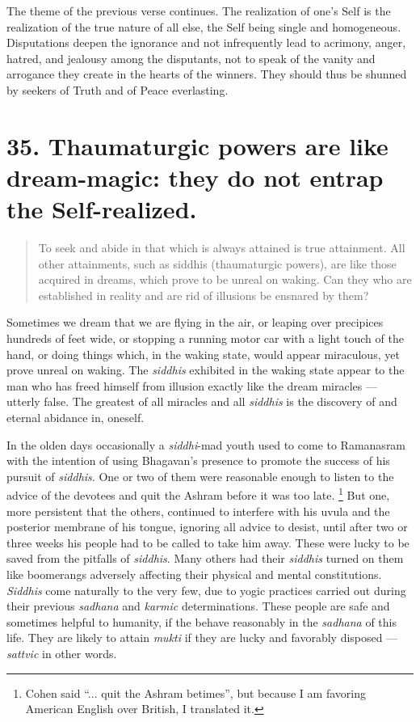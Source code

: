 \documentclass[12pt]{report}
\begin{document}
The theme of the previous verse continues. The realization of one's
Self is the realization of the true nature of all else, the Self being
single and homogeneous. Disputations deepen the ignorance and not
infrequently lead to acrimony, anger, hatred, and jealousy among the
disputants, not to speak of the vanity and arrogance they create in
the hearts of the winners. They should thus be shunned by seekers of
Truth and of Peace everlasting.

\section{35. Thaumaturgic powers are like dream-magic: they do not
  entrap the Self-realized.}

\begin{quote}
  To seek and abide in that which is always attained is true
  attainment. All other attainments, such as siddhis (thaumaturgic
  powers), are like those acquired in dreams, which prove to be unreal
  on waking. Can they who are established in reality and are rid of
  illusions be ensnared by them?
\end{quote}


Sometimes we dream that we are flying in the air, or leaping over
precipices hundreds of feet wide, or stopping a running motor car with
a light touch of the hand, or doing things which, in the waking state,
would appear miraculous, yet prove unreal on waking. The
\emph{siddhis} exhibited in the waking state appear to the man who has
freed himself from illusion exactly like the dream miracles ---
utterly false. The greatest of all miracles and all \emph{siddhis} is
the discovery of and eternal abidance in, oneself.

In the olden days occasionally a \emph{siddhi}-mad youth used to come
to Ramanasram with the intention of using Bhagavan's presence to
promote the success of his pursuit of \emph{siddhis}. One or two of
them were reasonable enough to listen to the advice of the devotees
and quit the Ashram before it was too late. \footnote{Cohen said
  ``... quit the Ashram betimes'', but because I am favoring American
  English over British, I translated it.} But one, more persistent
that the others, continued to interfere with his uvula and the
posterior membrane of his tongue, ignoring all advice to desist, until
after two or three weeks his people had to be called to take him
away. These were lucky to be saved from the pitfalls of
\emph{siddhis}. Many others had their \emph{siddhis} turned on them
like boomerangs adversely affecting their physical and mental
constitutions. \emph{Siddhis} come naturally to the very few, due to
yogic practices carried out during their previous \emph{sadhana} and
\emph{karmic} determinations. These people are safe and sometimes
helpful to humanity, if the behave reasonably in the \emph{sadhana} of
this life. They are likely to attain \emph{mukti} if they are lucky
and favorably disposed --- \emph{sattvic} in other words.
\end{document}
